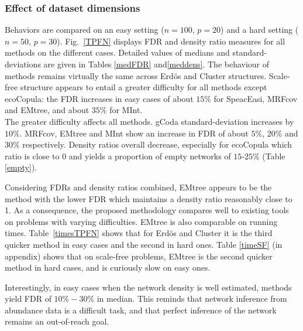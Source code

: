 \subsubsection{Effect of dataset dimensions}
\label{adverse}

Behaviors are compared on an easy setting ($n=100$, $p=20$) and a hard setting ($n=50$, $p=30$). Fig.~\ref{TPFN} displays FDR and density ratio measures for all methods on the different cases.  Detailed values of medians and standard-deviations are given in Tables \ref{medFDR} and\ref{meddens}. The behaviour of methods remains virtually the same across Erdös and Cluster structures. Scale-free structure appears to entail a greater difficulty for all methods except ecoCopula: the FDR increases in easy cases of about $15\%$ for SpeacEasi, MRFcov and EMtree, and about $35\%$ for MInt.\\
The greater difficulty affects all methods. gCoda standard-deviation increases by $10\%$. MRFcov, EMtree and MInt show an increase in FDR of about $5\%$, $20\%$ and $30\%$ respectively. Density ratios overall decrease, especially for ecoCopula which ratio is close to 0 and yields a proportion of empty networks of $15$-$25\%$ (Table \ref{empty}).


Considering FDRs and density ratios combined, EMtree appears to be the method with the lower FDR which maintains a density ratio reasonably close to 1. As a consequence, the proposed methodology compares well to existing tools on problems with varying difficulties. EMtree is also comparable on running times. Table~\ref{timesTPFN} shows that for Erdös and Cluster it is the third quicker method in easy cases and the second in hard ones. Table \ref{timeSF} (in appendix) shows that on scale-free problems, EMtree is the second quicker method in hard cases, and is curiously slow on easy ones.

Interestingly, in easy cases when the network density is well estimated, methods yield FDR of $10\%-30\%$ in median. This reminds that network inference from abundance data is a difficult task, and that perfect inference of the network remains an out-of-reach goal. 
 
